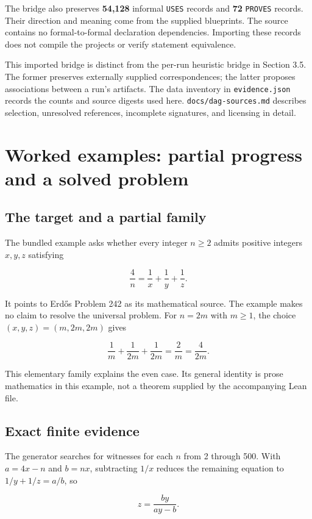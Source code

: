 \documentclass[10pt,letterpaper]{article}
\begin{document}
The bridge also preserves \textbf{54,128} informal \nolinkurl{USES} records and \textbf{72} \nolinkurl{PROVES} records. Their direction and meaning come from the supplied blueprints. The source contains no formal-to-formal declaration dependencies. Importing these records does not compile the projects or verify statement equivalence.

This imported bridge is distinct from the per-run heuristic bridge in Section 3.5. The former preserves externally supplied correspondences; the latter proposes associations between a run's artifacts. The data inventory in \nolinkurl{evidence.json} records the counts and source digests used here. \nolinkurl{docs/dag-sources.md} describes selection, unresolved references, incomplete signatures, and licensing in detail.

\section{Worked examples: partial progress and a solved problem}

\subsection{The target and a partial family}

The bundled example asks whether every integer $n\geq 2$ admits positive integers $x,y,z$ satisfying

\[
\frac{4}{n}=\frac{1}{x}+\frac{1}{y}+\frac{1}{z}.
\]

It points to Erd\H{o}s Problem 242 as its mathematical source. The example makes no claim to resolve the universal problem. For $n=2m$ with $m\geq 1$, the choice $(x,y,z)=(m,2m,2m)$ gives

\[
\frac{1}{m}+\frac{1}{2m}+\frac{1}{2m}=\frac{2}{m}=\frac{4}{2m}.
\]

This elementary family explains the even case. Its general identity is prose mathematics in this example, not a theorem supplied by the accompanying Lean file.

\subsection{Exact finite evidence}

The generator searches for witnesses for each $n$ from 2 through 500. With $a=4x-n$ and $b=nx$, subtracting $1/x$ reduces the remaining equation to $1/y+1/z=a/b$, so

\[
z=\frac{by}{ay-b}.
\]
\end{document}
